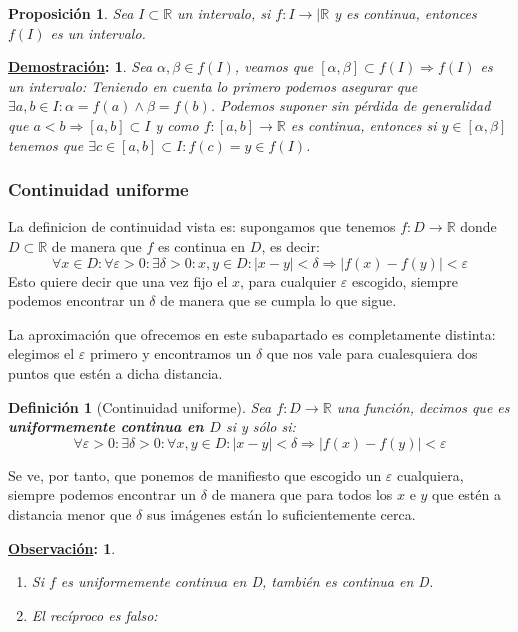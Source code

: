 \documentclass[10pt,a4paper,openright]{book}
\theoremstyle{break}
\newtheorem*{defi}{Definición}
\newtheorem*{prop}{Proposición}
\newtheorem*{demo}{\underline{Demostración}:}
\newtheorem*{obs}{\underline{Observación}:}
\begin{document}
\begin{prop}
Sea $I\subset \mathbb R$ un intervalo, si $f: I\rightarrow |\mathbb R$ y es continua, entonces $f(I)$ es un intervalo.
\end{prop}
\begin{demo}
Sea $\alpha, \beta\in f(I)$, veamos que $[\alpha, \beta]\subset f(I)\Rightarrow f(I)$ es un intervalo:
Teniendo en cuenta lo primero podemos asegurar que $\exists a, b \in I: \alpha=f(a) \wedge \beta=f(b)$. Podemos suponer sin pérdida de generalidad que $a<b\Rightarrow [a,b]\subset I$ y como $f:[a,b]\rightarrow \mathbb R$ es continua, entonces si $y \in [\alpha,\beta]$ tenemos que $\exists c\in [a,b]\subset I: f(c)=y\in f(I)$.
\end{demo}

\subsubsection{Continuidad uniforme}
La definicion de continuidad vista es: supongamos que tenemos $f: D\rightarrow \mathbb R$ donde $D\subset \mathbb R$ de manera que $f$ es continua en $D$, es decir:
$$\forall x\in D: \forall \varepsilon>0: \exists \delta>0 : x,y \in D: |x-y|<\delta\Rightarrow |f(x)-f(y)|<\varepsilon$$
Esto quiere decir que una vez fijo el $x$, para cualquier $\varepsilon$ escogido, siempre podemos encontrar un $\delta$ de manera que se cumpla lo que sigue.

La aproximación que ofrecemos en este subapartado es completamente distinta: elegimos el $\varepsilon$ primero y encontramos un $\delta$ que nos vale para cualesquiera dos puntos que estén a dicha distancia.

\begin{defi}[Continuidad uniforme]
Sea $f:D\rightarrow \mathbb{R}$ una función, decimos que es \textbf{uniformemente continua en $D$} si y sólo si:
$$\forall \varepsilon>0: \exists \delta>0 : \forall x, y \in D: |x-y|<\delta \Rightarrow |f(x)-f(y)|<\varepsilon$$
\end{defi}

Se ve, por tanto, que ponemos de manifiesto que escogido un $\varepsilon$ cualquiera, siempre podemos encontrar un $\delta$ de manera que para todos los $x$ e $y$ que estén a distancia menor que $\delta$ sus imágenes están lo suficientemente cerca.

\begin{obs}
\begin{enumerate}
\item Si $f$ es uniformemente continua en D, también es continua en D.

\item  El recíproco es falso:
\end{enumerate}
\end{obs}
\end{document}
